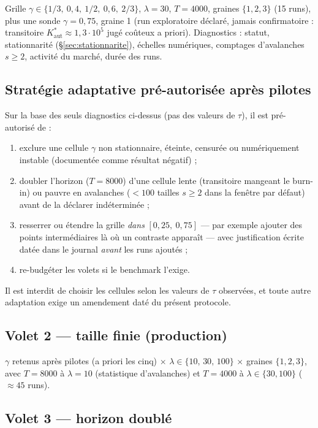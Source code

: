 \documentclass[11pt,a4paper]{article}
\newcommand{\Kaut}{K^{*}_{\mathrm{aut}}}
\begin{document}
Grille $\gamma\in\{1/3,\ 0{,}4,\ 1/2,\ 0{,}6,\ 2/3\}$, $\lambda=30$,
$T=4000$, graines $\{1,2,3\}$ (15 runs), plus une sonde $\gamma=0{,}75$,
graine 1 (run exploratoire déclaré, jamais confirmatoire : transitoire
$\Kaut\approx1{,}3\cdot10^{5}$ jugé coûteux a priori). Diagnostics :
statut, stationnarité (§\ref{sec:stationnarite}), échelles numériques,
comptages d'avalanches $s\ge2$, activité du marché, durée des runs.

\subsection{Stratégie adaptative pré-autorisée après pilotes}
\label{sec:adaptatif}

Sur la base des seuls diagnostics ci-dessus (pas des valeurs de $\tau$),
il est pré-autorisé de :
\begin{enumerate}
\item exclure une cellule $\gamma$ non stationnaire, éteinte, censurée ou
numériquement instable (documentée comme résultat négatif) ;
\item doubler l'horizon ($T=8000$) d'une cellule lente (transitoire
mangeant le burn-in) ou pauvre en avalanches ($<100$ tailles $s\ge2$ dans
la fenêtre par défaut) avant de la déclarer indéterminée ;
\item resserrer ou étendre la grille \emph{dans} $[0{,}25,\ 0{,}75]$ ---
par exemple ajouter des points intermédiaires là où un contraste apparaît
--- avec justification écrite datée dans le journal \emph{avant} les runs
ajoutés ;
\item re-budgéter les volets si le benchmark l'exige.
\end{enumerate}
Il est interdit de choisir les cellules selon les valeurs de $\tau$
observées, et toute autre adaptation exige un amendement daté du présent
protocole.

\subsection{Volet 2 --- taille finie (production)}

$\gamma$ retenus après pilotes (a priori les cinq) $\times$
$\lambda\in\{10,\,30,\,100\}$ $\times$ graines $\{1,2,3\}$, avec
$T=8000$ à $\lambda=10$ (statistique d'avalanches) et $T=4000$ à
$\lambda\in\{30,100\}$ ($\approx45$ runs).

\subsection{Volet 3 --- horizon doublé}
\end{document}
